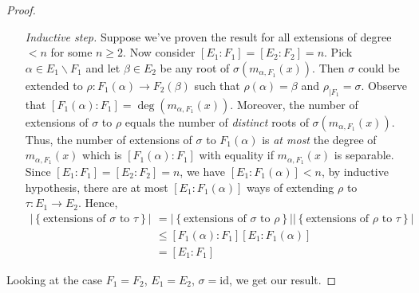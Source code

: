 \documentclass[12pt]{article}
\begin{document}
\begin{proof}
\begin{enumerate}[align=left]
        \item[\textit{Inductive step. }] Suppose we've proven the result for all extensions of degree $<n$ for some $n\geq 2$. Now consider $[E_1:F_1]=[E_2:F_2]=n$. Pick $\alpha\in E_1\backslash F_1$ and let $\beta\in E_2$ be any root of $\sigma(m_{\alpha,F_1}(x))$. Then $\sigma$ could be extended to $\rho:F_1(\alpha)\to F_2(\beta)$ such that $\rho(\alpha)=\beta$ and $\rho_{|F_1}=\sigma$. Observe that $[F_1(\alpha):F_1]=\deg(m_{\alpha,F_1}(x))$. Moreover, the number of extensions of $\sigma$ to $\rho$ equals the number of\textit{ distinct} roots of $\sigma(m_{\alpha,F_1}(x))$. Thus, the number of extensions of $\sigma$ to $F_1(\alpha)$ is \textit{at most} the degree of $m_{\alpha,F_1}(x)$ which is $[F_1(\alpha):F_1]$ with equality if $m_{\alpha,F_1}(x)$ is separable. Since $[E_1:F_1]=[E_2:F_2]=n$, we have $[E_1:F_1(\alpha)]<n$, by inductive hypothesis, there are at most $[E_1:F_1(\alpha)]$ ways of extending $\rho$ to $\tau:E_1\to E_2$. Hence, \begin{align*}
            |\left\{ \text{extensions of }\sigma \text{ to } \tau\right\}| &= |\left\{ \text{extensions of }\sigma \text{ to } \rho\right\}||\left\{ \text{extensions of }\rho \text{ to } \tau\right\}|\\
&\leq [F_1(\alpha):F_1][E_1:F_1(\alpha)]\\
&=[E_1:F_1]
        \end{align*}
    \end{enumerate}
    Looking at the case $F_1=F_2$, $E_1=E_2$, $\sigma=\mathrm{id}$, we get our result.
\end{proof}
\end{document}

